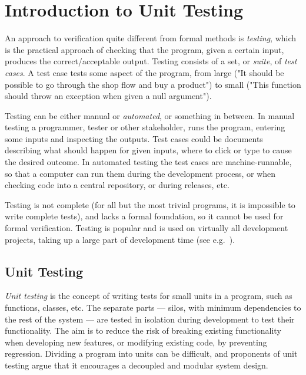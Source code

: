 
\pagestyle{newchap}
\chapter{Introduction to Unit Testing} \label{chapter-intro-to-unit-testing}

An approach to verification quite different from formal methods is
\emph{testing}, which is the practical approach of checking that the program,
given a certain input, produces the correct/acceptable output. Testing consists
of a set, or \textit{suite}, of \textit{test cases}. A test case tests some
aspect of the program, from large ("It should be possible to go through the
shop flow and buy a product") to small ("This function should throw an
exception when given a null argument").

Testing can be either manual or \textit{automated}, or something in between. In
manual testing a programmer, tester or other stakeholder, runs the program,
entering some inputs and inspecting the outputs. Test cases could be documents
describing what should happen for given inputs, where to click or type to cause
the desired outcome. In automated testing the test cases are
machine-runnable, so that a computer can run them during the development
process, or when checking code into a central repository, or during releases,
etc.

Testing is not complete (for all but the most trivial programs, it is
impossible to write complete tests), and lacks a formal foundation, so it
cannot be used for formal verification. Testing is popular and is used on
virtually all development projects, taking up a large part of development time
(see e.g.\ \cite{brooks75mythicalmanmonth}).


\section{Unit Testing}

\textit{Unit testing} is the concept of writing tests for small units in a
program, such as functions, classes, etc. The separate parts --- silos, with
minimum dependencies to the rest of the system --- are tested in isolation
during development to test their functionality. The aim is to reduce the risk
of breaking existing functionality when developing new features, or modifying
existing code, by preventing regression. Dividing a program into units can be
difficult, and proponents of unit testing argue that it encourages a decoupled
and modular system design.

